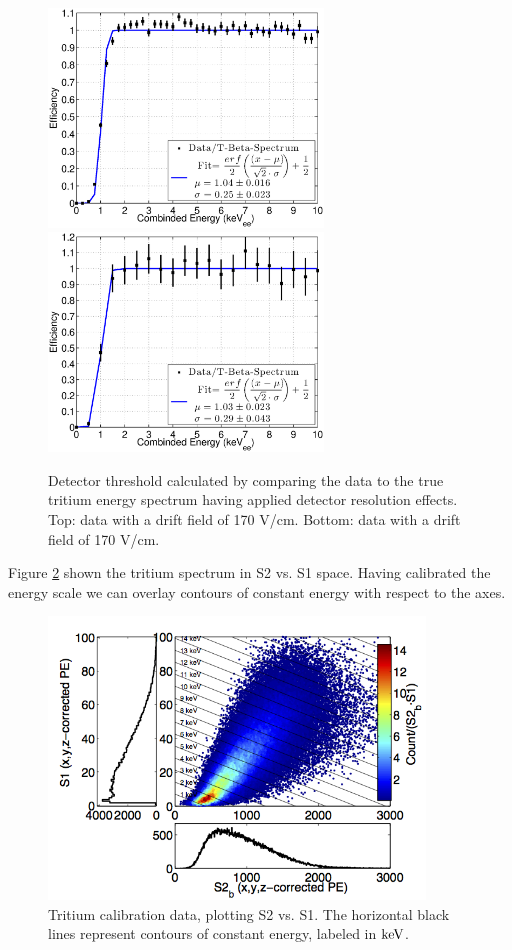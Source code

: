 \begin{figure}[h!]\centering
\includegraphics[width=73mm]{Chapter_E_Scale/Figures/E_Spec/E_Thres_LY_QY_iter1.eps}
\includegraphics[width=73mm]{Chapter_E_Scale/Figures/Spec_Thresh_100/E_Thres_.eps}
\caption{Detector threshold calculated by comparing the data to the true tritium energy spectrum having applied detector resolution effects. Top: data with a drift field of 170 V/cm. Bottom: data with a drift field of 170 V/cm.}
\label{fig:Thres}
\end{figure}


\newpage

Figure \ref{fig:T_S2S1} shown the tritium spectrum in S2 vs. S1 space. Having calibrated the energy scale we can overlay contours of constant energy with respect to the axes.

\begin{figure}[h!]\centering
\includegraphics[width=100mm]{Chapter_E_Scale/Figures/T_new/S2S1_T_.png}
\caption{Tritium calibration data, plotting S2 vs. S1. The horizontal black lines represent contours of constant energy, labeled in $\rm keV$. }
\label{fig:T_S2S1}
\end{figure}


